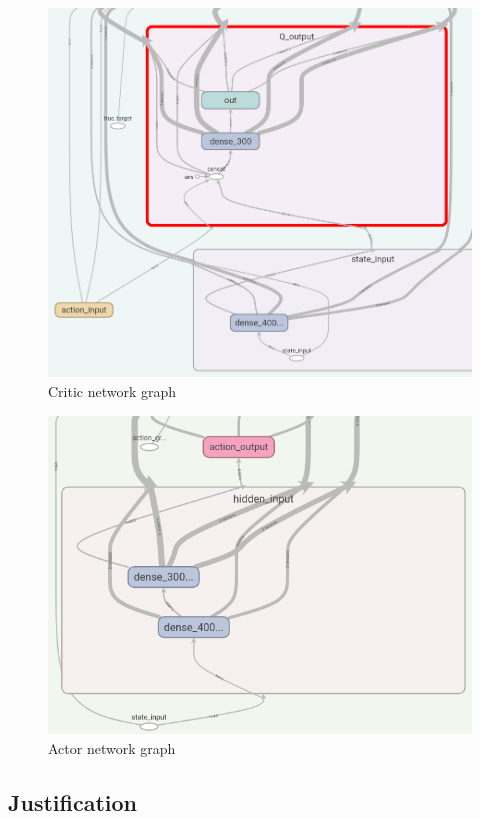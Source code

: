 \documentclass{article}
\begin{document}
\begin{figure}[ht]
  \centering
  \includegraphics[width=\textwidth]{critic_graph}
  \caption{Critic network graph}
  \label{fig:criticgraph}
\end{figure}

\begin{figure}[ht]
  \centering
  \includegraphics[width=\textwidth]{actor_graph}
  \caption{Actor network graph}
  \label{fig:actorgraph}
\end{figure}


\subsection{Justification}
\end{document}
